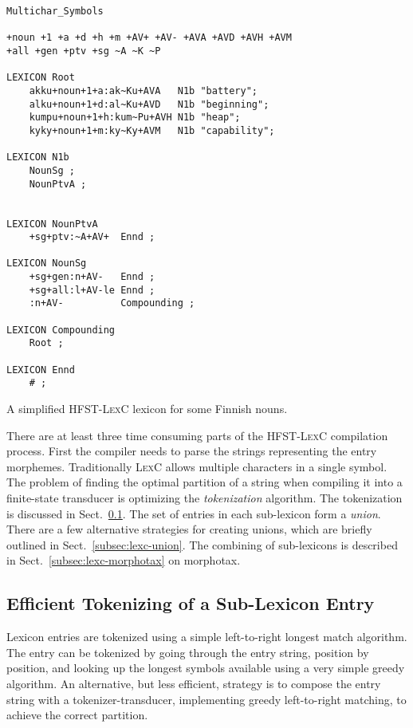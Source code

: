 \documentclass[postprint]{flammie}
\begin{document}
\begin{table}[!h]
\begin{verbatim}
Multichar_Symbols

+noun +1 +a +d +h +m +AV+ +AV- +AVA +AVD +AVH +AVM 
+all +gen +ptv +sg ~A ~K ~P 

LEXICON Root
    akku+noun+1+a:ak~Ku+AVA   N1b "battery";
    alku+noun+1+d:al~Ku+AVD   N1b "beginning";
    kumpu+noun+1+h:kum~Pu+AVH N1b "heap";
    kyky+noun+1+m:ky~Ky+AVM   N1b "capability";

LEXICON N1b
    NounSg ;
    NounPtvA ;


LEXICON NounPtvA
    +sg+ptv:~A+AV+  Ennd ;

LEXICON NounSg
    +sg+gen:n+AV-   Ennd ;
    +sg+all:l+AV-le Ennd ;
    :n+AV-          Compounding ;

LEXICON Compounding
    Root ;

LEXICON Ennd
    # ;
\end{verbatim}
\caption{A simplified \textsc{HFST-LexC} lexicon for some Finnish
nouns.}\label{fig:finnish-lexc}
\end{table}

There are at least three time consuming parts of the \textsc{HFST-LexC} compilation
process.  First the compiler needs to parse the strings representing
the entry morphemes. Traditionally \textsc{LexC} allows multiple
characters in a single symbol. The problem of finding the optimal
partition of a string when compiling it into a finite-state transducer
is optimizing the \emph{tokenization} algorithm. The tokenization is
discussed in Sect.~\ref{subsec:lexc-tokenisation}.  The set of entries
in each sub-lexicon form a \emph{union}. There are a few alternative
strategies for creating unions, which are briefly outlined in
Sect.~\ref{subsec:lexc-union}. The combining of sub-lexicons is
described in Sect.~\ref{subsec:lexc-morphotax} on morphotax.

\subsection{Efficient Tokenizing of a Sub-Lexicon Entry}
\label{subsec:lexc-tokenisation}

Lexicon entries are tokenized using a simple left-to-right longest
match algorithm. The entry can be tokenized by going through the entry
string, position by position, and looking up the longest symbols
available using a very simple greedy algorithm. An alternative, but
less efficient, strategy is to compose the entry string with a
tokenizer-transducer, implementing greedy left-to-right matching, to
achieve the correct partition.
\end{document}
